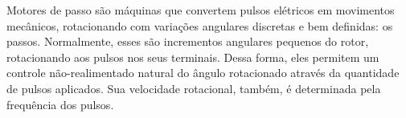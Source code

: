 Motores de passo são máquinas que convertem pulsos elétricos em movimentos mecânicos, rotacionando com variações angulares discretas e bem definidas: os passos. Normalmente, esses são incrementos angulares pequenos do rotor, rotacionando aos pulsos nos seus terminais. Dessa forma, eles permitem um controle não-realimentado natural do ângulo rotacionado através da quantidade de pulsos aplicados. Sua velocidade rotacional, também, é determinada pela frequência dos pulsos.

